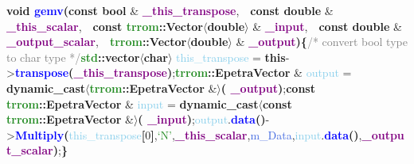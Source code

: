     \tab\textbf{\textcolor{BrickRed}{void} \textcolor{blue}{gemv}(const \textcolor{BrickRed}{bool}} \& \textbf{\textcolor{Purple}{\_this\_transpose}},\newline\tab\tab\tab\ \ \textbf{const \textcolor{BrickRed}{double}} \& \textbf{\textcolor{Purple}{\_this\_scalar}},\newline\tab\tab\tab\ \ \textbf{const \textcolor{ForestGreen}{trrom}::\textcolor{Melon}{Vector}$\langle$\textcolor{BrickRed}{double}$\rangle$} \& \textbf{\textcolor{Purple}{\_input}},\newline\tab\tab\tab\ \ \textbf{const \textcolor{BrickRed}{double}} \& \textbf{\textcolor{Purple}{\_output\_scalar}},\newline\tab\tab\tab\ \ \textbf{\textcolor{ForestGreen}{trrom}::\textcolor{Melon}{Vector}$\langle$\textcolor{BrickRed}{double}$\rangle$} \& \textbf{\textcolor{Purple}{\_output})\{}\newline\tab\tab\textcolor{gray}{/* convert bool type to char type */}\newline\tab\tab\textbf{\textcolor{ForestGreen}{std}::\textcolor{Melon}{vector}$\langle$\textcolor{BrickRed}{char}$\rangle$} \textcolor{SkyBlue}{this\_transpose} = \textbf{this}-\textgreater\textbf{\textcolor{blue}{transpose}(\textcolor{Purple}{\_this\_transpose})};\newline\tab\tab\textbf{\textcolor{ForestGreen}{trrom}::\textcolor{Melon}{EpetraVector}} \& \textcolor{SkyBlue}{output} = \newline\tab\tab\tab\textbf{dynamic\_cast$\langle$\textcolor{ForestGreen}{trrom}::\textcolor{Melon}{EpetraVector}} \&$\rangle$\textbf{(\textcolor{Purple}{ \_output})};\newline\tab\tab\textbf{const \textcolor{ForestGreen}{trrom}::\textcolor{Melon}{EpetraVector}} \& \textcolor{SkyBlue}{input} = \newline\tab\tab\tab\textbf{dynamic\_cast$\langle$const \textcolor{ForestGreen}{trrom}::\textcolor{Melon}{EpetraVector}} \&$\rangle$\textbf{(\textcolor{Purple}{ \_input})};\newline\tab\tab\textcolor{SkyBlue}{output}.\textbf{\textcolor{blue}{data}()}-\textgreater\textbf{\textcolor{blue}{Multiply}(}\textcolor{SkyBlue}{this\_transpose}\textbf{[}0\textbf{]},\newline\tab\tab\tab\tab\tab\tab\tab\textcolor{ForestGreen}{`N'},\newline\tab\tab\tab\tab\tab\tab\tab\textbf{\textcolor{Purple}{\_this\_scalar}},\newline\tab\tab\tab\tab\tab\tab\tab*\textcolor{RoyalBlue}{m\_Data},\newline\tab\tab\tab\tab\tab\tab\tab*\textcolor{SkyBlue}{input}.\textbf{\textcolor{blue}{data}()},\newline\tab\tab\tab\tab\tab\tab\tab\textbf{\textcolor{Purple}{\_output\_scalar})};\newline\tab\textbf{\}}\newline\newline
